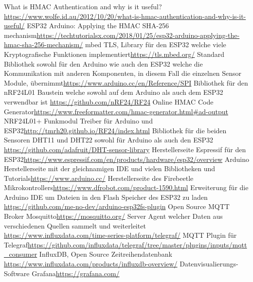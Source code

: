 \documentclass[
  12pt, %
  a4paper, %
  twoside, %
  openany, %
  numbers=noenddot, %
  BCOR=5mm, %
  parskip=half*, %
  thesis, %
]{bfhbook}
\begin{document}
\renewcommand\bibname{Linkverzeichnis}
\begin{thebibliography}{99}
   What is HMAC Authentication and why is it useful?\break \url{https://www.wolfe.id.au/2012/10/20/what-is-hmac-authentication-and-why-is-it-useful/}
    ESP32 Arduino: Applying the HMAC SHA-256 mechanism\break \url{https://techtutorialsx.com/2018/01/25/esp32-arduino-applying-the-hmac-sha-256-mechanism/}
     mbed TLS, Library für den ESP32 welche viele Kryptografische Funktionen implementiert\break \url{https://tls.mbed.org/}
     Standard Bibliothek sowohl für den Arduino wie auch den ESP32 welche die Kommunikation mit anderen Komponenten, in diesem Fall die einzelnen Sensor Module, übernimmt\break \url{https://www.arduino.cc/en/Reference/SPI}
     Bibliothek für den nRF24L01 Baustein welche sowohl auf dem Arduino als auch dem ESP32 verwendbar ist \break \url{https://github.com/nRF24/RF24}
    Online HMAC Code Generator\break \url{https://www.freeformatter.com/hmac-generator.html#ad-output}
    NRF24L01+ Funkmodul Treiber für Arduino und ESP32\break \url{http://tmrh20.github.io/RF24/index.html}
     Bibliothek für die beiden Sensoren DHT11 und DHT22 sowohl für Arduino als auch den ESP32 \break \url{https://github.com/adafruit/DHT-sensor-library}
    Herstellerseite Espressif für den ESP32\break \url{https://www.espressif.com/en/products/hardware/esp32/overview}
    Arduino Herstellerseite mit der gleichnamigen IDE und vielen Bibliotheken und Tutorials\break \url{https://www.arduino.cc/}
    Herstellerseite des Firebeetle Mikrokontrollers\break \url{https://www.dfrobot.com/product-1590.html}
    Erweiterung für die Arduino IDE um Dateien in den Flash Speicher des ESP32 zu laden \break \url{https://github.com/me-no-dev/arduino-esp32fs-plugin}
    Open Source MQTT Broker Mosquitto\break \url{https://mosquitto.org/}
     Server Agent welcher Daten aus verschiedenen Quellen sammelt und weiterleitet \break \url{https://www.influxdata.com/time-series-platform/telegraf/}
    MQTT Plugin für Telegraf\break \url{https://github.com/influxdata/telegraf/tree/master/plugins/inputs/mqtt_consumer}
     InfluxDB, Open Source Zeitreihendatenbank \break \url{https://www.influxdata.com/products/influxdb-overview/}
     Datenvisualierungs-Software Grafana\break \url{https://grafana.com/}
  \end{thebibliography}
\end{document}
